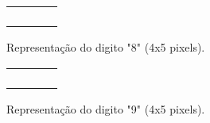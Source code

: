 \begin{figure}[h]
  \centering
  \begin{minipage}{5cm}
    \centering
    \begin{tabular}{|c|c|c|c|}
      \hline
      \W&\B&\B&\W\\ \hline
      \B&\W&\W&\B\\ \hline
      \W&\B&\B&\W\\ \hline
      \B&\W&\W&\B\\ \hline
      \W&\B&\B&\W\\ \hline
    \end{tabular}
  \end{minipage}
  \caption{Representação do digito "8" (4x5 pixels).}
  \label{fig:rep_8}  
\end{figure}
\begin{figure}[h]
  \centering
  \begin{minipage}{5cm}
    \centering
    \begin{tabular}{|c|c|c|c|}
      \hline
      \W&\B&\B&\W\\ \hline
      \B&\W&\W&\B\\ \hline
      \W&\B&\B&\B\\ \hline
      \W&\W&\W&\B\\ \hline
      \B&\B&\B&\B\\ \hline
    \end{tabular}
  \end{minipage}
  \caption{Representação do digito "9" (4x5 pixels).}
  \label{fig:rep_9}  
\end{figure}
